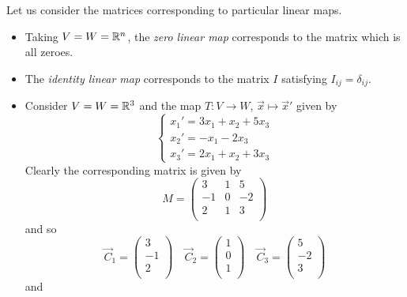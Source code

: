 \documentclass{../../template/note}
\begin{document}
    \begin{example}
        Let us consider the matrices corresponding to particular linear maps.
        \begin{itemize}
            \item Taking \(V = W = \mathbb R^n\), the \emph{zero linear map} corresponds to the matrix which is all zeroes.
            \item The \emph{identity linear map} corresponds to the matrix \(I\) satisfying \(I_{ij} = \delta_{ij}\).
            \item Consider \(V = W = \mathbb R^3\) and the map \(T: V \to W\), \(\vec x \mapsto \vec x'\) given by
            \[
                \begin{cases}
                    x_1' = 3x_1 + x_2 + 5x_3 \\
                    x_2' = -x_1 - 2x_3 \\
                    x_3' = 2x_1 + x_2 + 3x_3
                \end{cases}
            \]
            Clearly the corresponding matrix is given by
            \[
                M = \begin{pmatrix}
                 3 & 1 & 5 \\
                 -1 & 0 & -2 \\
                 2 & 1 & 3 \\
                \end{pmatrix}
            \]
            and so
            \[
                \vec C_1 = \begin{pmatrix}
                 3 \\
                 -1 \\
                 2 \\
                \end{pmatrix} \quad
                \vec C_2 = \begin{pmatrix}
                 1 \\
                 0 \\
                 1 \\
                \end{pmatrix} \quad
                \vec C_3 = \begin{pmatrix}
                 5 \\
                 -2 \\
                 3 \\
                \end{pmatrix}
            \]
            and
            \begin{align*}

\end{align*}
\end{itemize}
\end{example}
\end{document}
